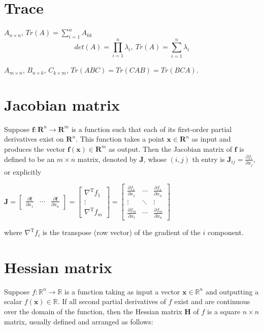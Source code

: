 \documentclass[11pt]{elegantbook}
\begin{document}
\section{Trace}
$A_{n\times n}$, $Tr(A)=\sum_{i=1}^nA_{kk}$
$$det(A)=\prod_{i=1}^n\lambda_i,\ Tr(A)=\sum_{i=1}^n\lambda_i$$
\begin{proposition}
$A_{m\times n}$, $B_{n\times k}$, $C_{k\times m}$, $Tr(ABC)=Tr(CAB)=Tr(BCA)$.
\end{proposition}






\section{Jacobian matrix}
Suppose $\mathbf{f}: \mathbf{R}^{n} \rightarrow \mathbf{R}^{m}$ is a function such that each of its first-order partial derivatives exist on $\mathbf{R}^{n} .$ This function takes a point $\mathbf{x} \in \mathbf{R}^{n}$ as input and produces the vector $\mathbf{f}(\mathbf{x}) \in \mathbf{R}^{m}$ as output. Then the Jacobian matrix of $\mathbf{f}$ is defined to be an $m \times n$ matrix, denoted by $\mathbf{J}$, whose $(i, j)$ th entry is $\mathbf{J}_{i j}=\frac{\partial f_{i}}{\partial x_{j}}$, or explicitly

$
\mathbf{J}=\left[\begin{array}{ccc}
\frac{\partial \mathbf{f}}{\partial x_{1}} & \cdots & \frac{\partial \mathbf{f}}{\partial x_{n}}
\end{array}\right]=\left[\begin{array}{c}
\nabla^{\mathrm{T}} f_{1} \\
\vdots \\
\nabla^{\mathrm{T}} f_{m}
\end{array}\right]=\left[\begin{array}{ccc}
\frac{\partial f_{1}}{\partial x_{1}} & \cdots & \frac{\partial f_{1}}{\partial x_{n}} \\
\vdots & \ddots & \vdots \\
\frac{\partial f_{m}}{\partial x_{1}} & \cdots & \frac{\partial f_{m}}{\partial x_{n}}
\end{array}\right]
$

where $\nabla^{\mathrm{T}} f_{i}$ is the transpose (row vector) of the gradient of the $i$ component.

\section{Hessian matrix}
Suppose $f: \mathbb{R}^{n} \rightarrow \mathbb{R}$ is a function taking as input a vector $\mathbf{x} \in \mathbb{R}^{n}$ and outputting a scalar $f(\mathbf{x}) \in \mathbb{R}$. If all second partial derivatives of $f$ exist and are continuous over the domain of the function, then the Hessian matrix $\mathbf{H}$ of $f$ is a square $n \times n$ matrix, usually defined and arranged as follows:
\end{document}
